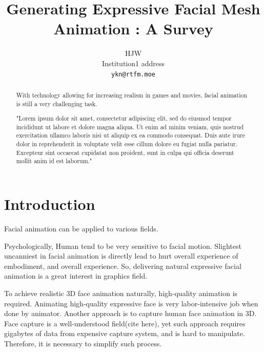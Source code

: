 \documentclass[10pt,twocolumn,letterpaper]{article}
\begin{document}
\title{Generating Expressive Facial Mesh Animation : A Survey}

\author{
HJW\\
Institution1 address\\
{\tt\small ykn@rtfm.moe}
}
\maketitle

\begin{abstract}
With technology allowing for increasing realism in games and movies, facial animation is still a very challenging task. 

"Lorem ipsum dolor sit amet, consectetur adipiscing elit, sed do eiusmod tempor incididunt ut labore et dolore magna aliqua. Ut enim ad minim veniam, quis nostrud exercitation ullamco laboris nisi ut aliquip ex ea commodo consequat. Duis aute irure dolor in reprehenderit in voluptate velit esse cillum dolore eu fugiat nulla pariatur. Excepteur sint occaecat cupidatat non proident, sunt in culpa qui officia deserunt mollit anim id est laborum."
\end{abstract}

\section{Introduction}
\label{sec:intro}

Facial animation can be applied to various fields.

Psychologically, Human tend to be very sensitive to facial motion. Slightest uncanniest in facial animation is directly lead to hurt overall experience of embodiment, and overall experience\cite{hansonUpendingUncannyValley}. So, delivering natural expressive facial animation is a great interest in graphics field.

To achieve realistic 3D face animation naturally, high-quality animation is required. Animating high-quality expressive face is very labor-intensive job when done by animator. Another approach is to capture human face animation in 3D. Face capture is a well-understood field(cite here), yet such approach requires gigabytes of data from expensive capture system, and is hard to manipulate. Therefore, it is necessary to simplify such process. 
\end{document}

